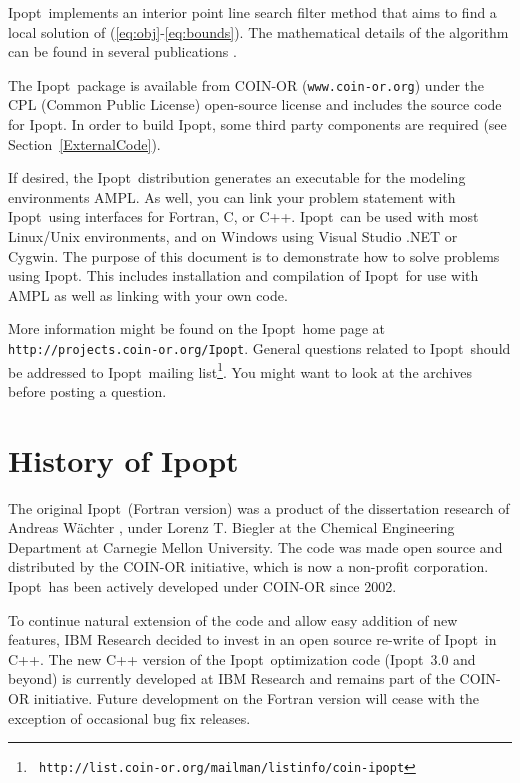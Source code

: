 \documentclass[letter,10pt]{article}
\newcommand{\Ipopt}{{\sc Ipopt}}
\begin{document}
\Ipopt\ implements an interior point line search filter method that
aims to find a local solution of (\ref{eq:obj}-\ref{eq:bounds}).  The mathematical details
of the algorithm can be found in several publications
\cite{NocWaeWal:adaptive,WaechterPhD,WaeBie:IpoptImpl,WaeBie05:filterglobal,WaeBie05:filterlocal}.

The \Ipopt\ package is available from COIN-OR
(\texttt{www.coin-or.org}) under the CPL (Common Public
License) open-source license and includes the source code for \Ipopt.
In order to build \Ipopt, some third party components are required
(see Section~\ref{ExternalCode}).

If desired, the \Ipopt\ distribution generates an executable for the
modeling environments AMPL. As well, you can link your problem
statement with \Ipopt\ using interfaces for Fortran, C, or C++.
\Ipopt\ can be used with most Linux/Unix environments, and on Windows
using Visual Studio .NET or Cygwin.  The purpose of this document is
to demonstrate how to solve problems using \Ipopt. This includes
installation and compilation of \Ipopt\ for use with AMPL as well as
linking with your own code.

More information might be found on the \Ipopt\ home page at
\texttt{http://projects.coin-or.org/Ipopt}.  General questions related
to \Ipopt\ should be addressed to \Ipopt\ mailing list\footnote{\tt
  http://list.coin-or.org/mailman/listinfo/coin-ipopt}. You might
want to look at the archives before posting a question.

\section{History of \Ipopt}
The original \Ipopt\ (Fortran version) was a product of the dissertation
research of Andreas W\"achter \cite{WaechterPhD}, under Lorenz
T. Biegler at the Chemical Engineering Department at Carnegie Mellon
University. The code was made open source and distributed by the
COIN-OR initiative, which is now a non-profit corporation.  \Ipopt\ has
been actively developed under COIN-OR since 2002.

To continue natural extension of the code and allow easy addition of
new features, IBM Research decided to invest in an open source
re-write of \Ipopt\ in C++.  The new C++ version of the \Ipopt\
optimization code (\Ipopt\ 3.0 and beyond) is currently developed at IBM
Research and remains part of the COIN-OR initiative. Future
development on the Fortran version will cease with the exception of
occasional bug fix releases.
\end{document}
